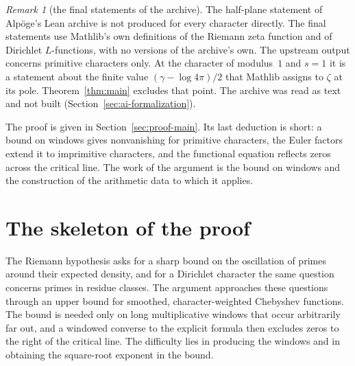 \documentclass[11pt]{amsbook}
\theoremstyle{plain}
\theoremstyle{definition}
\theoremstyle{remark}
\newtheorem{remark}[theorem]{Remark}
\numberwithin{equation}{section}
\numberwithin{figure}{chapter}
\numberwithin{table}{chapter}
\begin{document}
\begin{remark}[the final statements of the archive]\label{rem:ai-final}
The half-plane statement of Alp\"oge's Lean archive
\cite{AlpogeArchive2026} is not produced for every character
directly. The final statements use Mathlib's own definitions
of the Riemann zeta function and of Dirichlet $L$-functions, with no
versions of the archive's own. The upstream output concerns primitive
characters only. At the character of modulus~$1$ and $s=1$ it is a
statement about the finite value $(\gamma-\log4\pi)/2$ that Mathlib
assigns to $\zeta$ at its pole. Theorem~\ref{thm:main} excludes that
point. The archive was read as text and not built
(Section~\ref{sec:ai-formalization}).
\end{remark}

The proof is given in Section~\ref{sec:proof-main}. Its last
deduction is short: a bound on windows gives nonvanishing for
primitive characters, the Euler factors extend it to imprimitive
characters, and the functional equation reflects zeros across the
critical line. The work of the argument is the bound on windows and
the construction of the arithmetic data to which it applies.

\section{The skeleton of the proof}
\label{sec:bb-plan}

The Riemann hypothesis asks for a sharp bound on the oscillation of
primes around their expected density, and for a Dirichlet character
the same question concerns primes in residue classes. The argument
approaches these questions through an upper bound for smoothed,
character-weighted Chebyshev functions. The bound is needed only on
long multiplicative windows that occur arbitrarily far out, and a
windowed converse to the explicit formula then excludes zeros to the
right of the critical line. The difficulty lies in producing the
windows and in obtaining the square-root exponent in the bound.
\end{document}

